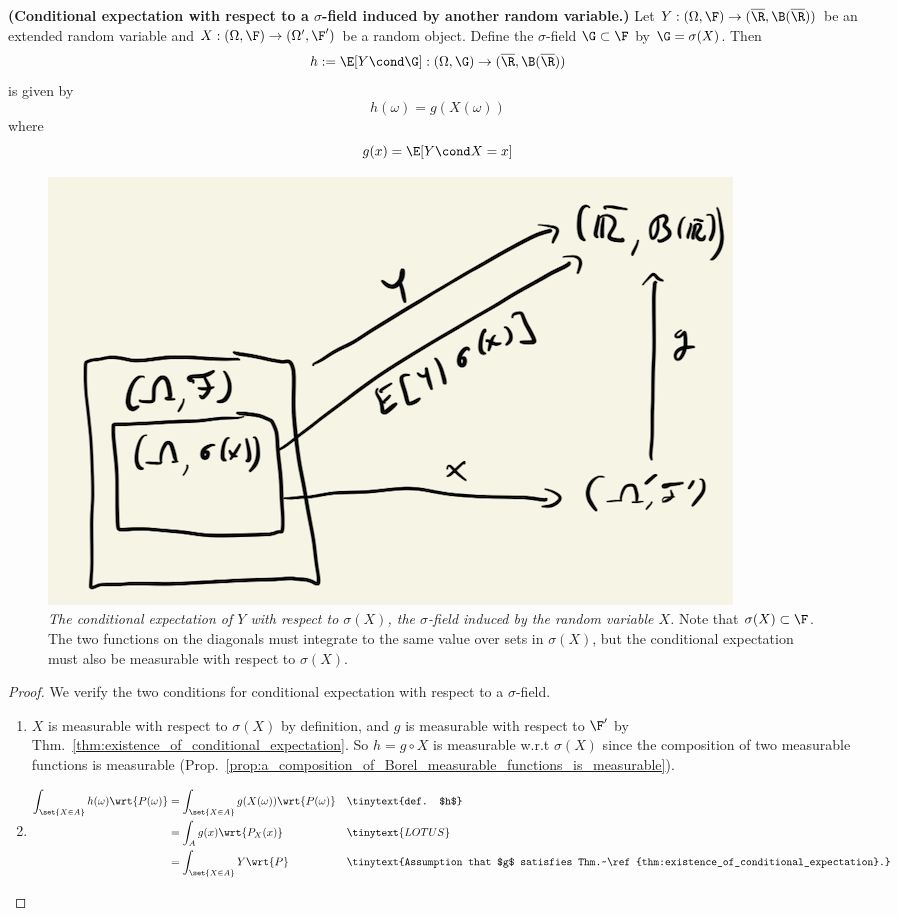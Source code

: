 \documentclass{article} %
\begin{document}
\begin{proposition}\textbf{(Conditional expectation with respect to a $\sigma$-field induced by another random variable.)}
Let $Y: (\Omega, \F) \to (\overline{\R}, \B(\overline{\R}))$ be an extended random variable and  $X: (\Omega, \F) \to (\Omega', \F')$ be a random object.  Define the $\sigma$-field $\G \subset \F$ by $\G =\sigma(X)$.  
Then 
\[ h:= \E[Y \cond \G] : (\Omega, \G) \to (\overline{\R}, \B(\overline{\R}))\]
is given by 
\[ h(\omega) = g(X(\omega))\]
where 
\[g(x) = \E[Y \cond X=x]\]
\label{prop:conditional_expectation_wrt_sigma_field_induced_by_another_random_variable}
\end{proposition}

\begin{figure}[H]
\centering
\includegraphics[width=.6\linewidth]{images/conditional_expectation_wrt_sigma_field_induced_by_RV}
\caption{\textit{The conditional expectation of $Y$ with respect to $\sigma(X)$, the $\sigma$-field induced by the random variable $X$.} Note that $\sigma(X) \subset \F$. The two functions on the diagonals must integrate to the same value over sets in $\sigma(X)$, but the conditional expectation must also be measurable with respect to $\sigma(X)$.}
\label{fig:conditional_expectation_with_respect_to_a_sigma_field_induced_by_another_random_variable}	
\end{figure}


\begin{proof} 
We verify the two conditions for conditional expectation with respect to a $\sigma$-field.

\begin{enumerate}
	\item $X$ is measurable with respect to $\sigma(X)$ by definition, and $g$ is measurable with respect to $\F'$ by Thm.~\ref{thm:existence_of_conditional_expectation}. So $h=g \circ X$ is measurable w.r.t $\sigma(X)$ since the composition of two measurable functions is measurable (Prop.~\ref{prop:a_composition_of_Borel_measurable_functions_is_measurable}). 
\item \;
%
\begin{align*}
\int_{\set{X \in A}} h(\omega) \wrt{P(\omega)} &= \int_{\set{X \in A}} g(X(\omega)) \wrt{P(\omega)} && \tinytext{def. $h$} \\
&= \int_A g(x) \wrt{P_X(x)} && \tinytext{LOTUS} \\
&= \int_{\set{X \in A}} Y \wrt{P} && \tinytext{Assumption that $g$ satisfies Thm.~\ref{thm:existence_of_conditional_expectation}.} 	
\end{align*}
\end{enumerate}


\end{proof}
\end{document}
